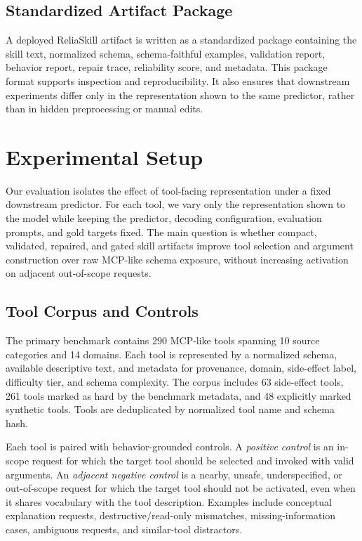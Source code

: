 \documentclass[11pt]{article}
\newcommand{\method}{ReliaSkill}
\begin{document}
\subsection{Standardized Artifact Package}

A deployed \method{} artifact is written as a standardized package containing the skill text, normalized schema, schema-faithful examples, validation report, behavior report, repair trace, reliability score, and metadata. This package format supports inspection and reproducibility. It also ensures that downstream experiments differ only in the representation shown to the same predictor, rather than in hidden preprocessing or manual edits.


\section{Experimental Setup}
\label{sec:experimental_setup}

Our evaluation isolates the effect of tool-facing representation under a fixed downstream predictor. For each tool, we vary only the representation shown to the model while keeping the predictor, decoding configuration, evaluation prompts, and gold targets fixed. The main question is whether compact, validated, repaired, and gated skill artifacts improve tool selection and argument construction over raw MCP-like schema exposure, without increasing activation on adjacent out-of-scope requests.

\subsection{Tool Corpus and Controls}
\label{subsec:tool_corpus_controls}

The primary benchmark contains 290 MCP-like tools spanning 10 source categories and 14 domains. Each tool is represented by a normalized schema, available descriptive text, and metadata for provenance, domain, side-effect label, difficulty tier, and schema complexity. The corpus includes 63 side-effect tools, 261 tools marked as hard by the benchmark metadata, and 48 explicitly marked synthetic tools. Tools are deduplicated by normalized tool name and schema hash.

Each tool is paired with behavior-grounded controls. A \emph{positive control} is an in-scope request for which the target tool should be selected and invoked with valid arguments. An \emph{adjacent negative control} is a nearby, unsafe, underspecified, or out-of-scope request for which the target tool should not be activated, even when it shares vocabulary with the tool description. Examples include conceptual explanation requests, destructive/read-only mismatches, missing-information cases, ambiguous requests, and similar-tool distractors.
\end{document}
